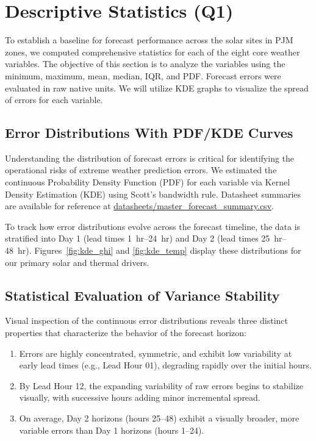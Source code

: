 \section{Descriptive Statistics (Q1)}\label{sec:descriptive}

To establish a baseline for forecast performance across the solar sites in PJM zones, we computed comprehensive  statistics for each of the eight core weather variables. The objective of this section is to analyze the variables using the minimum, maximum, mean, median, IQR, and PDF. Forecast errors were evaluated in raw native units. We will utilize KDE graphs to visualize the spread of errors for each variable.

\subsection{Error Distributions With PDF/KDE Curves}

Understanding the distribution of forecast errors is critical for identifying the operational risks of extreme weather prediction errors. We estimated the continuous Probability Density Function (PDF) for each variable via Kernel Density Estimation (KDE) using Scott's bandwidth rule. Datasheet summaries are available for reference at \url{datasheets/master_forecast_summary.csv}.

To track how error distributions evolve across the forecast timeline, the data is stratified into Day 1 (lead times \SI{1}{hr}--\SI{24}{hr}) and Day 2 (lead times \SI{25}{hr}--\SI{48}{hr}). Figures~\ref{fig:kde_ghi} and \ref{fig:kde_temp} display these distributions for our primary solar and thermal drivers.

\subsection{Statistical Evaluation of Variance Stability}

Visual inspection of the continuous error distributions reveals three distinct properties that characterize the behavior of the forecast horizon:
\begin{enumerate}
    \item Errors are highly concentrated, symmetric, and exhibit low variability at early lead times (e.g., Lead Hour 01), degrading rapidly over the initial hours.
    \item By Lead Hour 12, the expanding variability of raw errors begins to stabilize visually, with successive hours adding minor incremental spread.
    \item On average, Day 2 horizons (hours 25–48) exhibit a visually broader, more variable errors than Day 1 horizons (hours 1–24).
\end{enumerate}

